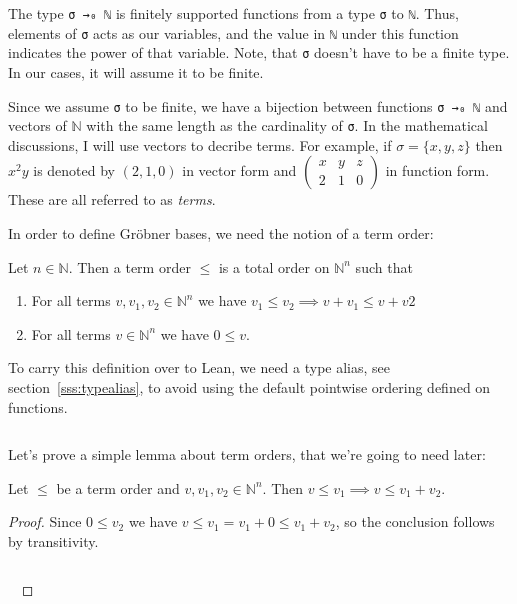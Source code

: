 \documentclass[a4paper, 12pt]{article}
\newcommand{\N}{\mathbb{N}}
\newcommand{\lean}[1]{\texttt{#1}}
\theoremstyle{changedot}
\theoremstyle{changedotbreak}
\theoremstyle{nonumberplain}
\newtheorem{proof}{Proof}
\begin{document}
The type \lean{σ →₀ ℕ} is finitely supported functions from a type \lean{σ} to \lean{ℕ}. Thus, elements of \lean{σ} acts as our variables, and the value in \lean{ℕ} under this function indicates the power of that variable. Note, that \lean{σ} doesn't have to be a finite type. In our cases, it will assume it to be finite.

Since we assume \lean{σ} to be finite, we have a bijection between functions \lean{σ →₀ ℕ} and vectors of $\N$ with the same length as the cardinality of \lean{σ}. In the mathematical discussions, I will use vectors to decribe terms. For example, if $\sigma = \{x, y, z\}$ then $x^{2}y$ is denoted by $(2, 1, 0)$ in vector form and $\begin{pmatrix}x & y & z \\ 2 & 1 & 0\end{pmatrix}$ in function form. These are all referred to as \textit{terms}.

In order to define Gröbner bases, we need the notion of a term order:

\begin{definition}
  Let $n \in \N$. Then a term order $\le$ is a total order on $\N^{n}$ such that
  \begin{enumerate}
    \item For all terms $v, v_{1}, v_{2} \in \N^{n}$ we have $v_{1} \le v_{2} \implies v + v_{1} \le v + v2$
      \item For all terms $v \in \N^{n}$ we have $0 \le v$.
  \end{enumerate}
\end{definition}

To carry this definition over to Lean, we need a type alias, see section~\ref{sss:typealias}, to avoid using the default pointwise ordering defined on functions.

\inputminted[firstline=21, lastline=25]{lean}{../src/monomial_order.lean}

Let's prove a simple lemma about term orders, that we're going to need later:

\begin{lemma}
  Let $\le$ be a term order and $v, v_{1}, v_{2} \in \N^{n}$. Then $v \le v_{1} \implies v \le v_{1} + v_{2}$.
\end{lemma}
\begin{proof}
  Since $0 \le v_{2}$ we have $v \le v_{1} = v_{1} + 0 \le v_{1} + v_{2}$, so the conclusion follows by transitivity.

\inputminted[firstline=37, lastline=43]{lean}{../src/monomial_order.lean}
  ~
\end{proof}
\end{document}
